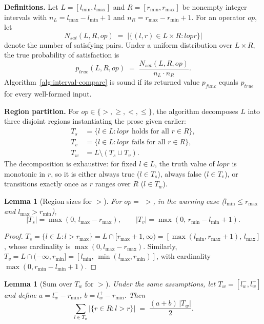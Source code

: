 \documentclass[pdflatex,sn-basic]{sn-jnl}%
\theoremstyle{thmstyleone}%
\newtheorem{lemma}[theorem]{Lemma}%
\theoremstyle{thmstyletwo}%
\theoremstyle{thmstylethree}%
\begin{document}
\smallskip
\noindent\textbf{Definitions.}
Let $L = [l_{\min}, l_{\max}]$ and $R = [r_{\min}, r_{\max}]$ be nonempty integer intervals with $n_L = l_{\max} - l_{\min} + 1$ and $n_R = r_{\max} - r_{\min} + 1$. For an operator $op$, let
\[
N_{\mathit{sat}}(L, R, op) \;=\; \big|\{(l, r) \in L \times R : l \mathrel{op} r\}\big|
\]
denote the number of satisfying pairs. Under a uniform distribution over $L \times R$, the true probability of satisfaction is
\[
p_{\mathit{true}}(L, R, op) \;=\; \frac{N_{\mathit{sat}}(L, R, op)}{n_L \cdot n_R}.
\]
Algorithm~\ref{alg:interval-compare} is sound if its returned value $p_{\mathit{func}}$ equals $p_{\mathit{true}}$ for every well-formed input.

\smallskip
\noindent\textbf{Region partition.}
For $op \in \{>, \geq, <, \leq\}$, the algorithm decomposes $L$ into three disjoint regions instantiating the prose given earlier:
\begin{align*}
T_s &= \{l \in L : l \mathrel{op} r \text{ holds for all } r \in R\}, \\
T_v &= \{l \in L : l \mathrel{op} r \text{ fails for all } r \in R\}, \\
T_w &= L \setminus (T_s \cup T_v).
\end{align*}
The decomposition is exhaustive: for fixed $l \in L$, the truth value of $l \mathrel{op} r$ is monotonic in $r$, so it is either always true ($l \in T_s$), always false ($l \in T_v$), or transitions exactly once as $r$ ranges over $R$ ($l \in T_w$).

\begin{lemma}[Region sizes for $>$]\label{lem:region-gt}
For $op = ${} $>$, in the warning case ($l_{\min} \leq r_{\max}$ and $l_{\max} > r_{\min}$),
\[
|T_s| = \max(0,\, l_{\max} - r_{\max}), \qquad
|T_v| = \max(0,\, r_{\min} - l_{\min} + 1).
\]
\end{lemma}

\begin{proof}
$T_s = \{l \in L : l > r_{\max}\} = L \cap [r_{\max}+1, \infty) = [\max(l_{\min}, r_{\max}+1),\, l_{\max}]$, whose cardinality is $\max(0, l_{\max} - r_{\max})$. Similarly, $T_v = L \cap (-\infty, r_{\min}] = [l_{\min},\, \min(l_{\max}, r_{\min})]$, with cardinality $\max(0, r_{\min} - l_{\min} + 1)$.
\end{proof}

\begin{lemma}[Sum over $T_w$ for $>$]\label{lem:tw-gt}
Under the same assumptions, let $T_w = [l_w^-, l_w^+]$ and define $a = l_w^- - r_{\min}$, $b = l_w^+ - r_{\min}$. Then
\[
\sum_{l \in T_w} \big|\{r \in R : l > r\}\big| \;=\; \frac{(a + b)\, |T_w|}{2}.
\]
\end{lemma}
\end{document}
